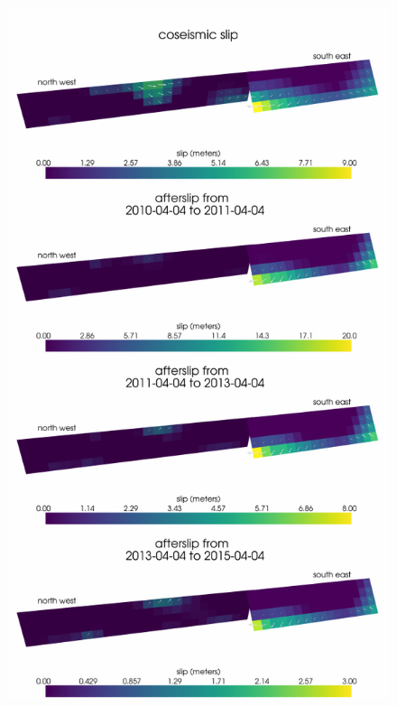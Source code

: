 \documentclass[review]{elsarticle}
\begin{document}
\begin{figure}
\includegraphics[scale=0.7]{Figures/ElasticSlip}
\caption{}
\label{fig:ElasticSlip}
\end{figure}
\end{document}
